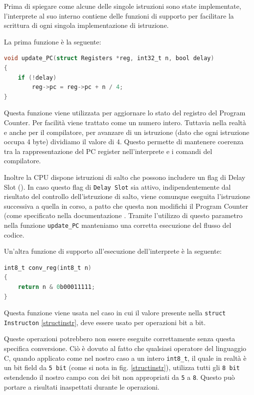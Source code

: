 \vspace{0.3cm}

Prima di spiegare come alcune delle singole istruzioni sono state implementate, l'interprete al suo interno contiene delle funzioni di supporto per facilitare la scrittura di ogni singola implementazione di istruzione.

La prima funzione è la seguente: 
\begin{lstlisting}[language=C,label={updatepc},caption={Update PC}]
void update_PC(struct Registers *reg, int32_t n, bool delay)
{
    if (!delay)
        reg->pc = reg->pc + n / 4;
}
\end{lstlisting}

Questa funzione viene utilizzata per aggiornare lo stato del registro del Program Counter. Per facilità viene trattato come un numero intero. Tuttavia nella realtà e anche per il compilatore, per avanzare di un istruzione (dato che ogni istruzione occupa 4 byte) dividiamo il valore di 4. Questo permette di mantenere coerenza tra la rappresentazione del PC register nell'interprete e i comandi del compilatore.

Inoltre la CPU dispone istruzioni di salto che possono includere un flag di Delay Slot (\cite{libroarchitetture}). In caso questo flag di \texttt{Delay Slot} sia attivo, indipendentemente dal risultato del controllo dell'istruzione di salto, viene comunque eseguita l'istruzione successiva a quella in corso, a patto che questa non modifichi il Program Counter (come specificato nella documentazione \cite{sitoMicroblaze}. Tramite l'utilizzo di questo parametro nella funzione \texttt{update\_PC} manteniamo una corretta esecuzione del flusso del codice.

\clearpage

\noindent Un'altra funzione di supporto all'esecuzione dell'interprete è la seguente:
\begin{lstlisting}[language=C,label={convreg}]
int8_t conv_reg(int8_t n)
{
    return n & 0b00011111;
}
\end{lstlisting}

Questa funzione viene usata nel caso in cui il valore presente nella \texttt{struct Instructon} \ref{structinstr}, deve essere usato per operazioni bit a bit. 

Queste operazioni potrebbero non essere eseguite correttamente senza questa specifica conversione. Ciò è dovuto al fatto che qualsiasi operatore del linguaggio C, quando applicato come nel nostro caso a un intero \texttt{int8\_t}, il quale in realtà è un bit field da \texttt{5 bit} (come si nota in fig. \ref{structinstr}), utilizza tutti gli \texttt{8 bit} estendendo il nostro campo con dei bit non appropriati da \texttt{5} a \texttt{8}. Questo può portare a risultati inaspettati durante le operazioni.

